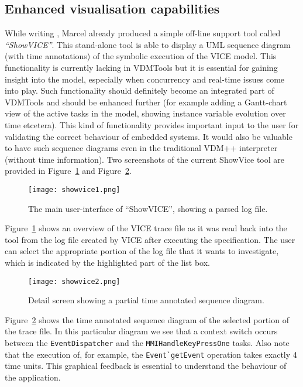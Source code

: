 \subsection{Enhanced visualisation capabilities}

While writing \cite{viceeval}, Marcel already produced a simple off-line
support tool called \textit{``ShowVICE''}. This stand-alone tool is able
to display a UML sequence diagram (with time annotations) of the symbolic
execution of the VICE model.  This functionality is currently lacking
in VDMTools but it is essential for gaining insight into the model,
especially when concurrency and real-time issues come into play.
Such functionality should definitely become an integrated part of
VDMTools and should be enhanced further (for example adding a Gantt-chart
view of the active tasks in the model, showing instance variable evolution
over time etcetera). This kind of functionality provides important input
to the user for validating the correct behaviour of embedded systems.
It would also be valuable to have such sequence diagrams even in the
traditional VDM++ interpreter (without time information). Two screenshots
of the current ShowVice tool are provided in Figure~\ref{fig:sv1} and
Figure~\ref{fig:sv2}.

\begin{figure}[!htb]
\begin{centering}
\texttt{[image: showvice1.png]}
\caption{The main user-interface of ``ShowVICE'', showing a parsed log file.}
\label{fig:sv1}
\end{centering}
\end{figure}

Figure~\ref{fig:sv1} shows an overview of the VICE trace file as it was
read back into the tool from the log file created by VICE after executing
the specification. The user can select the appropriate portion of the log
file that it wants to investigate, which is indicated by the highlighted
part of the list box.

\begin{figure}[!htb]
\begin{centering}
\texttt{[image: showvice2.png]}
\caption{Detail screen showing a partial time annotated sequence diagram.}
\label{fig:sv2}
\end{centering}
\end{figure}

Figure~\ref{fig:sv2} shows the time annotated sequence diagram of the
selected portion of the trace file. In this particular diagram we see
that a context switch occurs between the \verb+EventDispatcher+ and
the \verb+MMIHandleKeyPressOne+ tasks. Also note that the execution of,
for example, the \verb+Event`getEvent+ operation takes exactly 4 time
units. This graphical feedback is essential to understand the behaviour
of the application. \\


